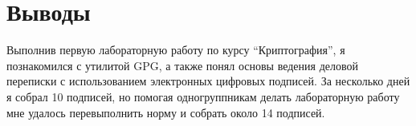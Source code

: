 \section{Выводы}
Выполнив первую лабораторную работу по курсу \enquote{Криптография}, я познакомился с утилитой GPG, а также понял основы ведения деловой переписки с использованием электронных цифровых подписей. За несколько дней я собрал 10 подписей, но помогая одногруппникам делать лабораторную работу мне удалось перевыполнить норму и собрать около 14 подписей.